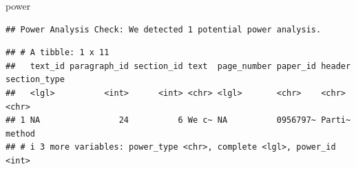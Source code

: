 \documentclass[
  ignorenonframetext,
]{beamer}
\begin{document}
\begin{frame}[fragile]{power}
\protect{}\label{power}
\begin{verbatim}
## Power Analysis Check: We detected 1 potential power analysis.
\end{verbatim}

\begin{verbatim}
## # A tibble: 1 x 11
##   text_id paragraph_id section_id text  page_number paper_id header section_type
##   <lgl>          <int>      <int> <chr> <lgl>       <chr>    <chr>  <chr>       
## 1 NA                24          6 We c~ NA          0956797~ Parti~ method      
## # i 3 more variables: power_type <chr>, complete <lgl>, power_id <int>
\end{verbatim}
\end{frame}
\end{document}

